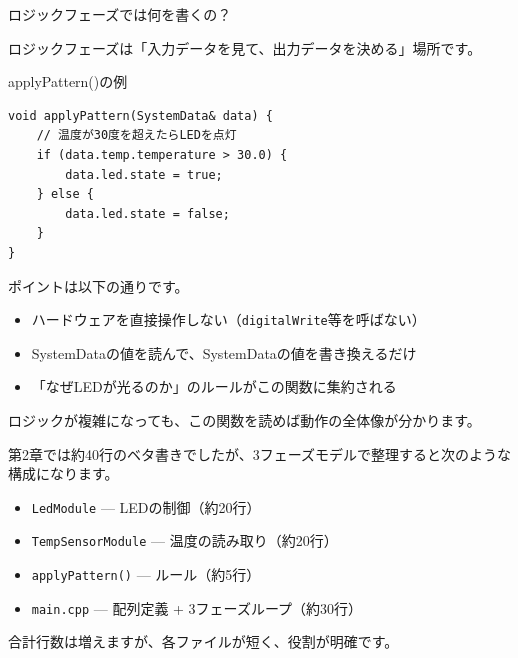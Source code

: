 \begin{qabox}{ロジックフェーズでは何を書くの？}

ロジックフェーズは「入力データを見て、出力データを決める」場所です。

\begin{goodexample}{applyPattern()の例}
\begin{lstlisting}
void applyPattern(SystemData& data) {
    // 温度が30度を超えたらLEDを点灯
    if (data.temp.temperature > 30.0) {
        data.led.state = true;
    } else {
        data.led.state = false;
    }
}
\end{lstlisting}
\end{goodexample}

ポイントは以下の通りです。

\begin{itemize}
  \item ハードウェアを直接操作しない（\texttt{digitalWrite}等を呼ばない）
  \item SystemDataの値を読んで、SystemDataの値を書き換えるだけ
  \item 「なぜLEDが光るのか」のルールがこの関数に集約される
\end{itemize}

ロジックが複雑になっても、この関数を読めば動作の全体像が分かります。

\begin{notebox}[第1章のコードがこう変わった]
第2章では約40行のベタ書きでしたが、3フェーズモデルで整理すると次のような構成になります。

\begin{itemize}
  \item \texttt{LedModule} — LEDの制御（約20行）
  \item \texttt{TempSensorModule} — 温度の読み取り（約20行）
  \item \texttt{applyPattern()} — ルール（約5行）
  \item \texttt{main.cpp} — 配列定義 + 3フェーズループ（約30行）
\end{itemize}

合計行数は増えますが、各ファイルが短く、役割が明確です。
\end{notebox}

\end{qabox}
